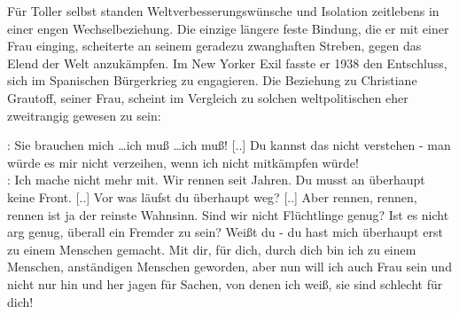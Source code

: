 Für Toller selbst standen Weltverbesserungswünsche und Isolation 
zeitlebens in einer engen Wechselbeziehung. Die einzige längere feste
Bindung, die er mit einer Frau einging, scheiterte an seinem geradezu
zwanghaften Streben, gegen das Elend der Welt anzukämpfen. Im New Yorker Exil
fasste er 1938 den Entschluss, sich im Spanischen Bürgerkrieg zu engagieren. Die
Beziehung zu Christiane Grautoff, seiner Frau, scheint im Vergleich zu solchen
weltpolitischen  eher zweitrangig gewesen zu sein:

\label{grautoff}
\begin{BlockQuote}
: Sie brauchen mich \ldots ich muß \ldots ich muß! [..] 
Du kannst das nicht verstehen - man würde es mir nicht verzeihen, wenn ich
nicht mitkämpfen würde!\\
: Ich mache nicht mehr mit. Wir rennen seit
Jahren. Du musst an überhaupt keine Front. [..] Vor was läufst du überhaupt
weg? [..] Aber rennen, rennen, rennen ist ja der reinste Wahnsinn. Sind wir
nicht Flüchtlinge genug? Ist es nicht arg genug, überall ein Fremder zu sein?
Weißt du - du hast mich überhaupt erst zu einem Menschen gemacht. Mit dir,
für dich, durch dich bin ich zu einem Menschen, anständigen Menschen
geworden, aber nun will ich auch Frau sein und nicht nur hin und her jagen
für Sachen, von denen ich weiß, sie sind schlecht für
dich!
\end{BlockQuote}


